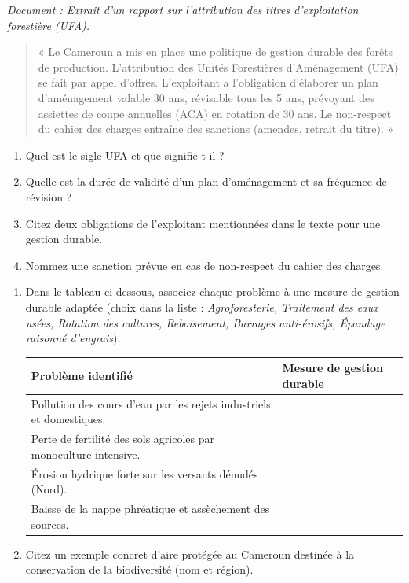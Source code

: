 \documentclass[11pt]{article}
\begin{document}
\begin{exercice}
\textit{Document : Extrait d'un rapport sur l'attribution des titres d'exploitation forestière (UFA).}
\begin{quote}
« Le Cameroun a mis en place une politique de gestion durable des forêts de production. L'attribution des Unités Forestières d'Aménagement (UFA) se fait par appel d'offres. L'exploitant a l'obligation d'élaborer un plan d'aménagement valable 30 ans, révisable tous les 5 ans, prévoyant des assiettes de coupe annuelles (ACA) en rotation de 30 ans. Le non-respect du cahier des charges entraîne des sanctions (amendes, retrait du titre). »
\end{quote}
\begin{enumerate}
    \item Quel est le sigle UFA et que signifie-t-il ?
    \item Quelle est la durée de validité d'un plan d'aménagement et sa fréquence de révision ?
    \item Citez deux obligations de l'exploitant mentionnées dans le texte pour une gestion durable.
    \item Nommez une sanction prévue en cas de non-respect du cahier des charges.
\end{enumerate}
\end{exercice}

\begin{exercice}
\begin{enumerate}
    \item Dans le tableau ci-dessous, associez chaque problème à une mesure de gestion durable adaptée (choix dans la liste : \textit{Agroforesterie, Traitement des eaux usées, Rotation des cultures, Reboisement, Barrages anti-érosifs, Épandage raisonné d'engrais}).
    \begin{tabular}{|p{5cm}|p{7cm}|}
        \hline
        \textbf{Problème identifié} & \textbf{Mesure de gestion durable} \\
        \hline
        Pollution des cours d'eau par les rejets industriels et domestiques. & \\
        \hline
        Perte de fertilité des sols agricoles par monoculture intensive. & \\
        \hline
        Érosion hydrique forte sur les versants dénudés (Nord). & \\
        \hline
        Baisse de la nappe phréatique et assèchement des sources. & \\
        \hline
    \end{tabular}
    \item Citez un exemple concret d'aire protégée au Cameroun destinée à la conservation de la biodiversité (nom et région).
\end{enumerate}
\end{exercice}
\end{document}
